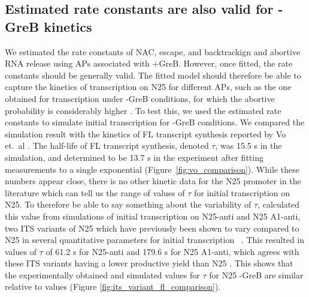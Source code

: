 \subsection{Estimated rate constants are also valid for -GreB kinetics}
We estimated the rate constants of NAC, escape, and backtrackign and abortive
RNA release using APs associated with +GreB. However, once fitted, the rate
constants should be generally valid. The fitted model should therefore be able
to capture the kinetics of transcription on N25 for different APs, such as the
one obtained for transcription under -GreB conditions, for which the abortive
probability is considerably higher \cite{hsu_initial_2006}. To test this, we
used the estimated rate constants to simulate initial transcription for -GreB
conditions. We compared the simulation result with the kinetics of FL
transcript synthesis reported by Vo et.\ al \cite{vo_vitro_2003-1}. The
half-life of FL transcript synthesis, denoted $\tau$, was 15.5 s in the
simulation, and determined to be 13.7 s in the experiment after fitting
measurements to a single exponential (Figure~\ref{fig:vo_comparison}). While these
numbers appear close, there is no other kinetic data for the N25 promoter in
the literature which can tell us the range of values of $\tau$ for initial
transcription on N25. To therefore be able to say something about the
variability of $\tau$, calculated this value from simulations of initial
transcription on N25-anti and N25 A1-anti, two ITS variants of N25 which have
previously been shown to vary compared to N25 in several quantitative
parameters for initial transcription~
\cite{hsu_initial_2006,chan_anti-initial_2001,kammerer_functional_1986}. This
resulted in values of $\tau$ of 61.2 s for N25-anti and 179.6 s for N25
A1-anti, which agrees with these ITS variants having a lower productive yield
than N25 \cite{hsu_initial_2006}. This shows that the experimentally obtained
and simulated values for $\tau$ for N25 -GreB are similar relative to values
(Figure \ref{fig:its_variant_fl_comparison}).

